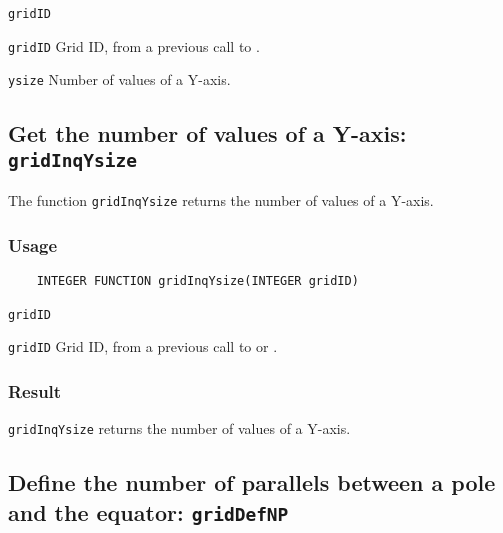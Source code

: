 \hspace*{4mm}\begin{minipage}[]{15cm}
\begin{deflist}{\texttt{gridID}\ }
\item[\texttt{gridID}]
Grid ID, from a previous call to {}.
\item[\texttt{ysize}]
Number of values of a Y-axis.

\end{deflist}
\end{minipage}


\subsection{Get the number of values of a Y-axis: \texttt{gridInqYsize}}
\label{gridInqYsize}

The function {\texttt{gridInqYsize}} returns the number of values of a Y-axis.

\subsubsection*{Usage}

\begin{verbatim}
    INTEGER FUNCTION gridInqYsize(INTEGER gridID)
\end{verbatim}

\hspace*{4mm}\begin{minipage}[]{15cm}
\begin{deflist}{\texttt{gridID}\ }
\item[\texttt{gridID}]
Grid ID, from a previous call to {} or {}.

\end{deflist}
\end{minipage}

\subsubsection*{Result}

{\texttt{gridInqYsize}} returns the number of values of a Y-axis.



\subsection{Define the number of parallels between a pole and the equator: \texttt{gridDefNP}}
\label{gridDefNP}

